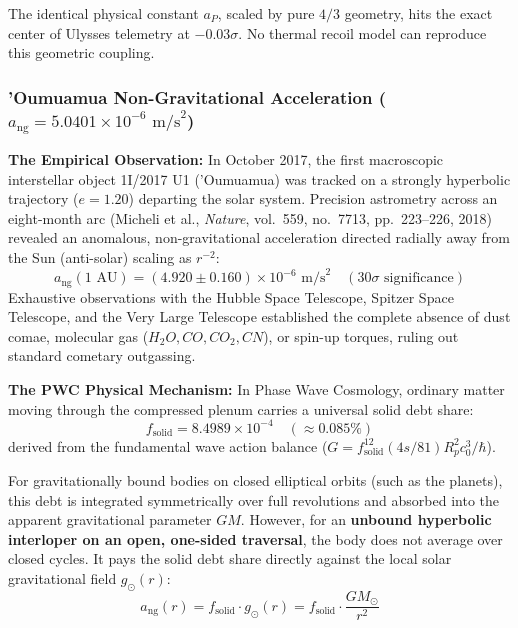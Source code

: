 \documentclass[11pt,a4paper]{article}
\begin{document}
The identical physical constant $a_P$, scaled by pure $4/3$ geometry, hits the exact center of Ulysses telemetry at $-0.03\sigma$. No thermal recoil model can reproduce this geometric coupling.

\subsubsection{'Oumuamua Non-Gravitational Acceleration (\texorpdfstring{$a_{\text{ng}} = 5.0401 \times 10^{-6}\text{ m/s}^2$}{ang = 5.04e-06 m/s\textasciicircum 2})}
\label{subsubsec:oumuamua_acceleration}

\textbf{The Empirical Observation:}  
In October 2017, the first macroscopic interstellar object 1I/2017 U1 ('Oumuamua) was tracked on a strongly hyperbolic trajectory ($e = 1.20$) departing the solar system. Precision astrometry across an eight-month arc (Micheli et al., \textit{Nature}, vol.~559, no.~7713, pp.~223--226, 2018)~\cite{Micheli2018} revealed an anomalous, non-gravitational acceleration directed radially away from the Sun (anti-solar) scaling as $r^{-2}$:
\begin{equation}
a_{\text{ng}}(1\text{ AU}) = (4.920 \pm 0.160) \times 10^{-6}\text{ m/s}^2 \quad (30\sigma\text{ significance})
\end{equation}
Exhaustive observations with the Hubble Space Telescope, Spitzer Space Telescope, and the Very Large Telescope established the complete absence of dust comae, molecular gas ($H_2O, CO, CO_2, CN$), or spin-up torques, ruling out standard cometary outgassing.

\textbf{The PWC Physical Mechanism:}  
In Phase Wave Cosmology, ordinary matter moving through the compressed plenum carries a universal solid debt share:
\begin{equation}
f_{\text{solid}} = 8.4989 \times 10^{-4} \quad (\approx 0.085\%)
\end{equation}
derived from the fundamental wave action balance ($G = f_{\text{solid}}^{12}(4s/81)R_p^2 c_0^3/\hbar$).

For gravitationally bound bodies on closed elliptical orbits (such as the planets), this debt is integrated symmetrically over full revolutions and absorbed into the apparent gravitational parameter $GM$. However, for an \textbf{unbound hyperbolic interloper on an open, one-sided traversal}, the body does not average over closed cycles. It pays the solid debt share directly against the local solar gravitational field $g_\odot(r)$:
\begin{equation}
a_{\text{ng}}(r) = f_{\text{solid}} \cdot g_\odot(r) = f_{\text{solid}} \cdot \frac{GM_\odot}{r^2}
\label{eq:a_oumuamua_pwc}
\end{equation}
\end{document}
